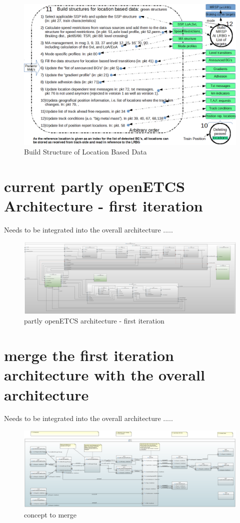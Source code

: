 \documentclass{template/openetcs_report}
\begin{document}
\begin{figure}[hbtp]
\centering
\includegraphics[angle=0, scale=0.55] {images/build_structure_for_location_based_data.png}
\caption{Build Structure of Location Based Data}
\label{fig:lbd}
\end{figure}

 
 \newpage
 \chapter{current partly openETCS Architecture - first iteration}
 Needs to be integrated into the overall architecture .....
  \begin{figure}[hbtp]
\centering
\includegraphics [angle=90, scale=0.2]{images/Current_partly_openETCS_architecture}
\caption{partly openETCS architecture - first iteration}
\end{figure}
 
 \newpage
  \chapter{merge the first iteration architecture with the overall architecture}
 Needs to be integrated into the overall architecture .....
  \begin{figure}[hbtp]
\centering
\includegraphics [angle=90, scale=0.3]{images/architecture-db}
\caption{concept to merge}
\end{figure}
 
\end{document}
